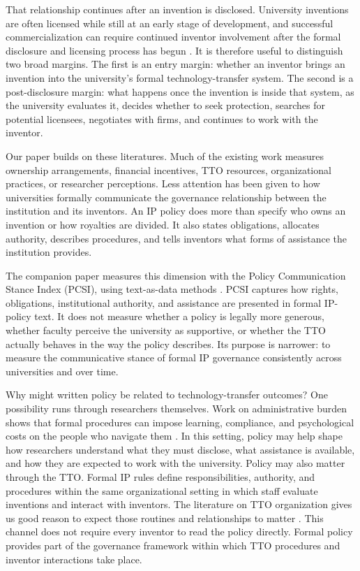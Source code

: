 That relationship continues after an invention is disclosed. University inventions are often licensed while still at an early stage of development, and successful commercialization can require continued inventor involvement after the formal disclosure and licensing process has begun \citep{JensenThursby2001}. It is therefore useful to distinguish two broad margins. The first is an entry margin: whether an inventor brings an invention into the university's formal technology-transfer system. The second is a post-disclosure margin: what happens once the invention is inside that system, as the university evaluates it, decides whether to seek protection, searches for potential licensees, negotiates with firms, and continues to work with the inventor.

Our paper builds on these literatures. Much of the existing work measures ownership arrangements, financial incentives, TTO resources, organizational practices, or researcher perceptions. Less attention has been given to how universities formally communicate the governance relationship between the institution and its inventors. An IP policy does more than specify who owns an invention or how royalties are divided. It also states obligations, allocates authority, describes procedures, and tells inventors what forms of assistance the institution provides.

The companion paper \citep{SharmaPCSI2026} measures this dimension with the Policy Communication Stance Index (PCSI), using text-as-data methods \citep{LoughranMcDonald2011,GentzkowKellyTaddy2019,GrimmerRobertsStewart2022}. PCSI captures how rights, obligations, institutional authority, and assistance are presented in formal IP-policy text. It does not measure whether a policy is legally more generous, whether faculty perceive the university as supportive, or whether the TTO actually behaves in the way the policy describes. Its purpose is narrower: to measure the communicative stance of formal IP governance consistently across universities and over time.

Why might written policy be related to technology-transfer outcomes? One possibility runs through researchers themselves. Work on administrative burden shows that formal procedures can impose learning, compliance, and psychological costs on the people who navigate them \citep{MoynihanHerdHarvey2015,HerdMoynihan2018}. In this setting, policy may help shape how researchers understand what they must disclose, what assistance is available, and how they are expected to work with the university. Policy may also matter through the TTO. Formal IP rules define responsibilities, authority, and procedures within the same organizational setting in which staff evaluate inventions and interact with inventors. The literature on TTO organization gives us good reason to expect those routines and relationships to matter \citep{JensenThursbyThursby2003,DebackereVeugelers2005,HolgerssonEtAl2019}. This channel does not require every inventor to read the policy directly. Formal policy provides part of the governance framework within which TTO procedures and inventor interactions take place.

